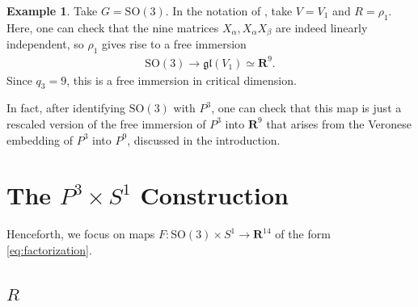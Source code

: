 \documentclass[a4paper,10pt,leqno]{article}
\numberwithin{equation}{section}
\theoremstyle{plain}
\theoremstyle{definition}
\newtheorem{ex}[thm]{Example}
\theoremstyle{remark}
\newcommand{\bb}{\mathbf}
\newcommand{\fr}{\mathfrak}
\newcommand{\SO}{\mathrm{SO}}
\begin{document}
\begin{ex}\label{ex:veronese-so-3}
Take $G = \SO(3)$.
In the notation of , take $V = V_1$ and $R = \rho_1$.
Here, one can check that the nine matrices $X_\alpha, X_\alpha X_\beta$ are indeed linearly independent, so $\rho_1$ gives rise to a free immersion 
\begin{align}
\SO(3) \to \fr{gl}(V_1) \simeq \bb{R}^9.
\end{align}
Since $q_3 = 9$, this is a free immersion in critical dimension.

In fact, after identifying $\SO(3)$ with $P^3$, one can check that this map is just a rescaled version of the free immersion of $P^3$ into $\bb{R}^9$ that arises from the Veronese embedding of $P^3$ into $P^9$, discussed in the introduction.
\end{ex}

\section{\texorpdfstring{The $P^3 \times S^1$ Construction}{The P³ × S¹ Construction}}\label{sec:p-3-times-s-1}

Henceforth, we focus on maps $F \colon \SO(3) \times S^1 \to \bb{R}^{14}$ of the form \eqref{eq:factorization}.

\subsection{$R$}\label{subsec:r}
\end{document}
